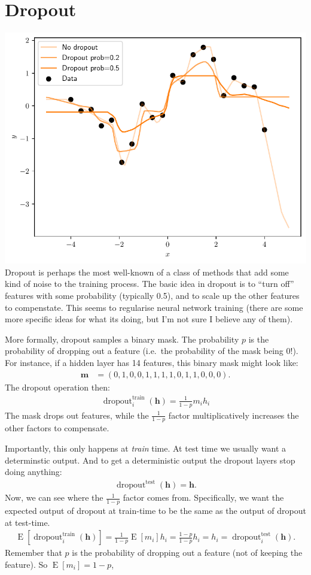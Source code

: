 \documentclass{article}
\newcommand{\bracket}[3]{\left#1 #3 \right#2}
\newcommand{\sqb}{\bracket{[}{]}}
\newcommand{\0}{\mathbf{0}}
\newcommand{\h}{\mathbf{h}}
\newcommand{\E}{\operatorname{E}\sqb}
\newcommand{\dropout}{\operatorname{dropout}}
\begin{document}
\section{Dropout}
\includegraphics[width=\textwidth]{dropout.pdf}
Dropout is perhaps the most well-known of a class of methods that add some kind of noise to the training process.
The basic idea in dropout is to ``turn off'' features with some probability (typically 0.5), and to scale up the other features to compenstate.
This seems to regularise neural network training (there are some more specific ideas for what its doing, but I'm not sure I believe any of them).

More formally, dropout samples a binary mask. 
The probability $p$ is the probability of dropping out a feature (i.e.\ the probability of the mask being $0$!).
For instance, if a hidden layer has 14 features, this binary mask might look like:
\begin{align}
  \mathbf{m} &= (0, 1, 0, 0, 1, 1, 1, 1, 0, 1, 1, 0, 0, 0).
\end{align}
The dropout operation then:
\begin{align}
  \dropout_i^\text{train}(\h) = \tfrac{1}{1-p} m_i h_i
\end{align}
The mask drops out features, while the $\tfrac{1}{1-p}$ factor multiplicatively increases the other factors to compensate.

Importantly, this only happens at \textit{train} time.  At test time we usually want a determinstic output.  And to get a deterministic output the dropout layers stop doing anything:
\begin{align}
  \dropout^\text{test}(\h) = \h.
\end{align}
Now, we can see where the $\tfrac{1}{1-p}$ factor comes from.
Specifically, we want the expected output of dropout at train-time to be the same as the output of dropout at test-time.
\begin{align}
  \E{\dropout_i^\text{train}(\h)} = \tfrac{1}{1-p} \E{m_i} h_i = \tfrac{1-p}{1-p} h_i = h_i = \dropout_i^\text{test}(\h).
\end{align}
Remember that $p$ is the probability of dropping out a feature (not of keeping the feature).  So $\E{m_i} = 1-p$,
\end{document}
